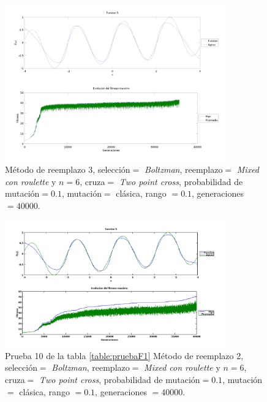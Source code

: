 \documentclass[11pt,a4paper]{article}
\begin{document}
\begin{figure}[h]
\centering
\includegraphics[width=0.85\textwidth]{img/best-met3.png}
\caption{\label{fig:best-met3} Método de reemplazo 3, selección$=$ \emph{Boltzman}, reemplazo$=$ \emph{Mixed con roulette} y $n=6$, cruza$=$ \emph{Two point cross}, probabilidad de mutación$=0.1$, mutación$=$ clásica, rango $=0.1$, generaciones $= 40000$.}
\end{figure}

\begin{figure}[h]
\centering
\includegraphics[width=0.85\textwidth]{img/mejor-config-40000-gen.png}
\caption{\label{fig:mejor-4000} Prueba 10 de la tabla \ref{table:pruebaF1} Método de reemplazo 2, selección$=$ \emph{Boltzman}, reemplazo$=$ \emph{Mixed con roulette} y $n=6$, cruza$=$ \emph{Two point cross}, probabilidad de mutación$=0.1$, mutación$=$ clásica, rango $=0.1$, generaciones $= 40000$.}
\end{figure}
\end{document}
